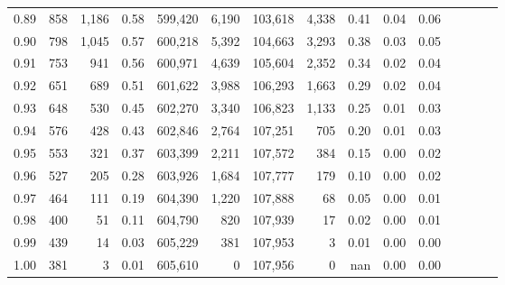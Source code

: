 \begin{tabular}{rrrcrrrrrrrrrrr}
0.89 &     858 &  1,186 &                                       0.58 &  599,420 &    6,190 &  103,618 &    4,338 &  0.41 &  0.04 &                         0.06 \\
0.90 &     798 &  1,045 &                                       0.57 &  600,218 &    5,392 &  104,663 &    3,293 &  0.38 &  0.03 &                         0.05 \\
0.91 &     753 &    941 &                                       0.56 &  600,971 &    4,639 &  105,604 &    2,352 &  0.34 &  0.02 &                         0.04 \\
0.92 &     651 &    689 &                                       0.51 &  601,622 &    3,988 &  106,293 &    1,663 &  0.29 &  0.02 &                         0.04 \\
0.93 &     648 &    530 &                                       0.45 &  602,270 &    3,340 &  106,823 &    1,133 &  0.25 &  0.01 &                         0.03 \\
0.94 &     576 &    428 &                                       0.43 &  602,846 &    2,764 &  107,251 &      705 &  0.20 &  0.01 &                         0.03 \\
0.95 &     553 &    321 &                                       0.37 &  603,399 &    2,211 &  107,572 &      384 &  0.15 &  0.00 &                         0.02 \\
0.96 &     527 &    205 &                                       0.28 &  603,926 &    1,684 &  107,777 &      179 &  0.10 &  0.00 &                         0.02 \\
0.97 &     464 &    111 &                                       0.19 &  604,390 &    1,220 &  107,888 &       68 &  0.05 &  0.00 &                         0.01 \\
0.98 &     400 &     51 &                                       0.11 &  604,790 &      820 &  107,939 &       17 &  0.02 &  0.00 &                         0.01 \\
0.99 &     439 &     14 &                                       0.03 &  605,229 &      381 &  107,953 &        3 &  0.01 &  0.00 &                         0.00 \\
1.00 &     381 &      3 &                                       0.01 &  605,610 &        0 &  107,956 &        0 &   nan &  0.00 &                         0.00 \\
\bottomrule
\end{tabular}
